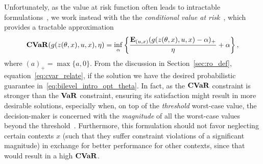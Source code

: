Unfortunately, as the value at risk function often leads to intractable formulations~\citep{cvaropt}, we work instead with the the {\it conditional value at risk}~\citep{cvaropt,cvar}, which provides a tractable approximation
\begin{equation*}
	\label{eq:cvar}
\mathop{\bf CVaR}(g(z(\theta,x),u,x),\eta) = \inf_{\alpha}\left\{\frac{\mathbf{E}_{(u,x)} (g(z(\theta,x),u,x)- \alpha)_+}{\eta} + \alpha\right\},
\end{equation*}
where $(a)_+ = \max\{a,0\}$. 
From the discussion in Section~\ref{sec:ro_def}, equation~\eqref{eq:cvar_relate},
if the solution  we have the desired probabilistic guarantee in~\eqref{eq:bilevel_intro_opt_theta}.
In fact, as the $\mathop{\bf CVaR}$ constraint is stronger than the $\bf{VaR}$ constraint, ensuring its satisfaction might result in more desirable solutions, especially when, on top of the {\it threshold} worst-case value, the decision-maker is concerned with the {\it magnitude} of all the worst-case values beyond the threshold~\citep{cvar_var}. Furthermore, this formulation should not favor neglecting certain contexts $x$ (such that they suffer constraint violations of a significant magnitude) in exchange for better performance for other contexts, since that would result in a high $\mathop{\bf CVaR}$.


